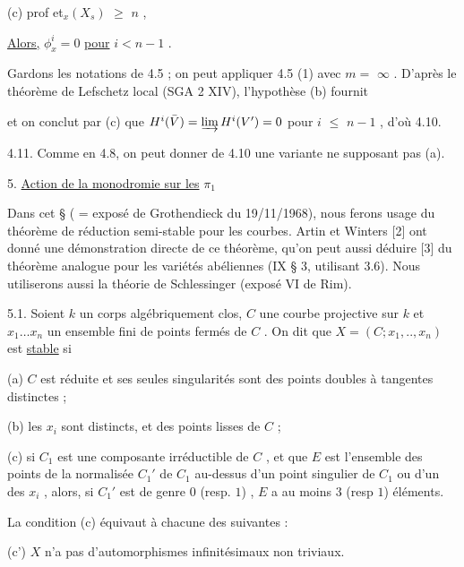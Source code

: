 (c)  prof et$_x(X_s)$ $\geqslant$ $n$ ,

\underline{Alors,} $\phi^i_x = 0$ \underline{pour}  $i < n-1$ .

Gardons les notations de 4.5 ; on peut appliquer 4.5 (1) avec  $m =$ $\infty$ . D'après le théorème de Lefschetz local  (SGA 2 XIV), l'hypothèse (b) fournit

\begin{center}
\end{center}
et on conclut par (c) que  $H^i(\bar{V}) = \varinjlim H^i(V') = 0$  pour  $i$ $\leqslant$ $n-1$ , d'où 4.10.

4.11.  Comme en 4.8, on peut donner de 4.10 une variante ne supposant pas (a).



5.  \underline{Action de la monodromie sur les}  $\pi_1$

Dans cet § ( = exposé de Grothendieck du 19/11/1968), nous ferons usage du théorème de réduction semi-stable pour les courbes. Artin et Winters [2] ont donné une démonstration directe de ce théorème, qu'on peut aussi déduire [3] du théorème analogue pour les variétés abéliennes (IX § 3, utilisant 3.6). Nous utiliserons aussi la théorie de  Schlessinger (exposé VI de  Rim).

5.1.  Soient  $k$  un corps algébriquement clos, $C$ une courbe projective sur  $k$  et $x_1 \ldots x_n$  un ensemble fini de points fermés de  $C$ . On dit que  $X = (C ; x_1,.., x_n)$ est \underline{stable} si

(a) $C$ est réduite et ses seules singularités sont des points doubles à tangentes distinctes ;

(b) les  $x_i$  sont distincts, et des points lisses de  $C$ ;

(c) si  $C_1$  est une composante irréductible de  $C$ , et que  $E$  est l'ensemble des points de la normalisée  $C_1'$  de  $C_1$  au-dessus d'un point singulier de  $C_1$  ou d'un des  $x_i$ , alors, si  $C_1'$  est de genre  $0$  (resp. $1$) ,  $E$  a au moins  $3$ (resp $1$) éléments.

La condition (c) équivaut à chacune des suivantes :

(c')  $X$  n'a pas d'automorphismes infinitésimaux non triviaux.


